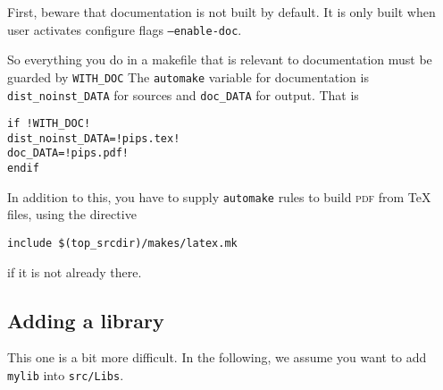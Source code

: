 \documentclass[a4paper]{article}
\newcommand{\automake}{\texttt{automake}}
\newcommand{\dir}[1]{\texttt{#1}}
\begin{document}
First, beware that documentation is not built by default.
It is only built when user activates configure flags \texttt{--enable-doc}.

So everything you do in a makefile that is relevant to documentation must be guarded by \texttt{WITH\_DOC}
The \automake{} variable for documentation is \texttt{dist\_noinst\_DATA} for sources and \texttt{doc\_DATA} for output.
That is
\begin{lstlisting}
if !WITH_DOC!
dist_noinst_DATA=!pips.tex!
doc_DATA=!pips.pdf!
endif
\end{lstlisting}

In addition to this, you have to supply \automake{} rules to build
\textsc{pdf} from \TeX{} files, using the directive
\begin{lstlisting}
include $(top_srcdir)/makes/latex.mk
\end{lstlisting}
if it is not already there.


\subsection{Adding a library}

This one is a bit more difficult.
In the following, we assume you want to add \dir{mylib} into \dir{src/Libs}.
\end{document}
